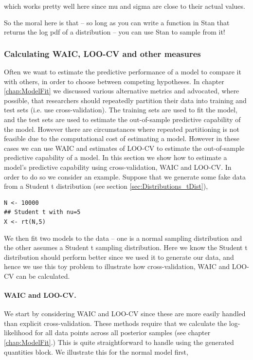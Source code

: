 \documentclass[11pt,fullpage]{book}
\begin{document}
which works pretty well here since mu and sigma are close to their actual values.

So the moral here is that -- so long as you can write a function in Stan that returns the log pdf of a distribution -- you can use Stan to sample from it!

\subsubsection{Calculating WAIC, LOO-CV and other measures}\label{sec:StanJags_WAICLOO}
Often we want to estimate the predictive performance of a model to compare it with others, in order to choose between competing hypotheses. In chapter \ref{chap:ModelFit} we discussed various alternative metrics and advocated, where possible, that researchers should repeatedly partition their data into training and test sets (i.e. use cross-validation). The training sets are used to fit the model, and the test sets are used to estimate the out-of-sample predictive capability of the model. However there are circumstances where repeated partitioning is not feasible due to the computational cost of estimating a model. However in these cases we can use WAIC and estimates of LOO-CV to estimate the out-of-sample predictive capability of a model. In this section we show how to estimate a model's predictive capability using cross-validation, WAIC and LOO-CV. In order to do so we consider an example. Suppose that we generate some fake data from a Student t distribution (see section \ref{sec:Distributions_tDist}),

\begin{verbatim}
N <- 10000
## Student t with nu=5
X <- rt(N,5)
\end{verbatim}

We then fit two models to the data -- one is a normal sampling distribution and the other assumes a Student t sampling distribution. Here we know the Student t distribution should perform better since we used it to generate our data, and hence we use this toy problem to illustrate how cross-validation, WAIC and LOO-CV can be calculated.

\paragraph{WAIC and LOO-CV.}
We start by considering WAIC and LOO-CV since these are more easily handled than explicit cross-validation. These methods require that we calculate the log-likelihood for all data points across all posterior samples (see chapter \ref{chap:ModelFit}.) This is quite straightforward to handle using the generated quantities block. We illustrate this for the normal model first,
\end{document}
